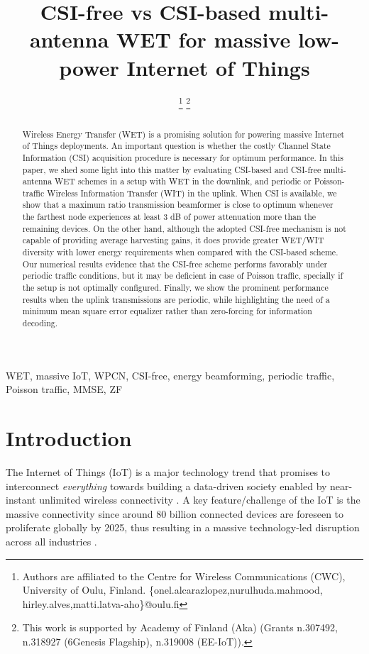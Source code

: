 \documentclass[10pt,journal,a4paper]{IEEEtran}
\begin{document}
	
	\title{CSI-free vs CSI-based multi-antenna WET for massive low-power Internet of Things}
	\author{
		\thanks{Authors are affiliated to the Centre for Wireless Communications (CWC), University of Oulu, Finland. \{onel.alcarazlopez,nurulhuda.mahmood, hirley.alves,matti.latva-aho\}@oulu.fi}	
		\thanks{This work is supported by Academy of Finland (Aka) (Grants n.307492, n.318927 (6Genesis Flagship), n.319008 (EE-IoT)).}}
	
	\maketitle

	\begin{abstract}
		Wireless Energy Transfer (WET) is a promising solution for powering massive Internet of Things 
		deployments. An important question is whether the costly Channel State Information (CSI) acquisition procedure is necessary for optimum performance. In this paper, we shed some light into this matter by evaluating   CSI-based and CSI-free multi-antenna WET schemes in a setup with WET in the downlink, and periodic or Poisson-traffic Wireless Information Transfer (WIT) in the uplink. When CSI is available, we show that a maximum ratio transmission beamformer is close to optimum whenever the farthest node experiences at least 3 dB of power attenuation more than the remaining devices. On the other hand, although the adopted CSI-free mechanism  is not capable of providing average harvesting gains, it does provide greater WET/WIT  diversity with lower energy requirements when compared with the CSI-based scheme. Our numerical results evidence that the CSI-free scheme performs favorably under periodic traffic conditions, but it may be deficient in case of Poisson traffic, specially if the setup is not optimally configured.  Finally, we show the prominent performance results when the uplink transmissions are periodic, while highlighting the need of a minimum mean square error equalizer rather than zero-forcing for information decoding.
	\end{abstract}
	\begin{IEEEkeywords}
		WET, massive IoT, WPCN, CSI-free, energy beamforming, periodic traffic, Poisson traffic, MMSE, ZF
	\end{IEEEkeywords}
%
	\section{Introduction}\label{introduction}
	The Internet of Things (IoT) is a major technology trend that promises to interconnect
	\textit{everything} towards building a data-driven society enabled by near-instant unlimited wireless connectivity \cite{Matti.2019,Mahmood.2020}.
	A key feature/challenge of the IoT is the massive connectivity since around 80 billion connected devices are foreseen to proliferate globally by 2025, thus resulting in a massive technology-led disruption across all industries \cite{sullivan.2020}.
	
\end{document}
